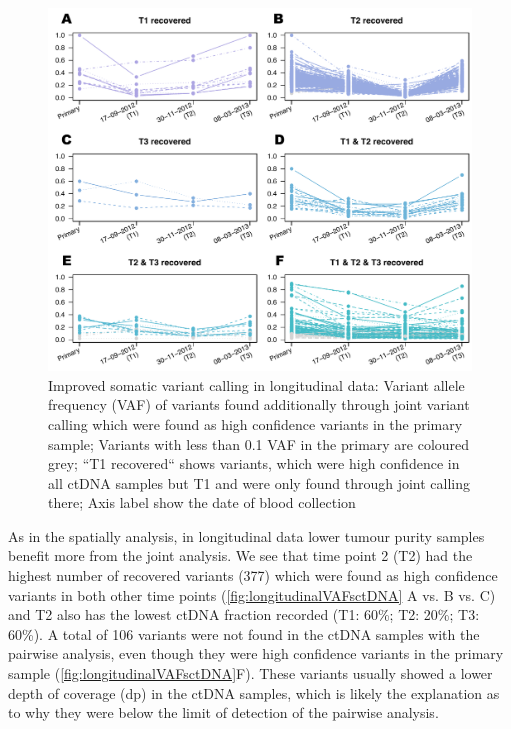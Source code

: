 \begin{figure}[ht]
\centering
\includegraphics[width=.99\linewidth]{Figures/jointVariantCalling/longitudinalCA9ctDNAVafs.pdf}
\caption[Improved somatic variant calling in longitudinal data]{Improved somatic variant calling in longitudinal data: Variant allele frequency (VAF) of variants found additionally through joint variant calling which were found as high confidence variants in the primary sample; Variants with less than 0.1 VAF in the primary are coloured grey; ``T1 recovered`` shows variants, which were high confidence in all ctDNA samples but T1 and were only found through joint calling there; Axis label show the date of blood collection }\label{fig:longitudinalVAFsctDNA}
\end{figure}

As in the spatially analysis, in longitudinal data lower tumour purity samples benefit more from the joint analysis. We see that time point 2 (T2) had the highest number of recovered variants (377) which were found as high confidence variants in both other time points (\autoref{fig:longitudinalVAFsctDNA} A vs. B vs. C) and T2 also has the lowest ctDNA fraction recorded (T1: 60\%; T2: 20\%; T3: 60\%). A total of 106 variants were not found in the ctDNA samples with the pairwise analysis, even though they were high confidence variants in the primary sample (\autoref{fig:longitudinalVAFsctDNA}F). These variants usually showed a lower depth of coverage (dp) in the ctDNA samples, which is likely the explanation as to why they were below the limit of detection of the pairwise analysis. 

